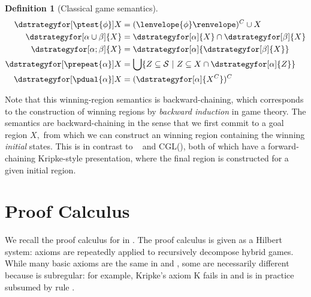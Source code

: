 \documentclass[12pt]{cmuthesis}
\theoremstyle{definition}
\newtheorem{definition}{Definition}
\theoremstyle{remark}
\newcommand{\rref}[2][]{\prettyref{#2}}
\newcommand{\allstate}{\mathcal{S}}
\newcommand{\CGL}{\textsf{CGL}\xspace}
\newcommand{\fint}[1]{\lenvelope{#1}\renvelope}
\begin{document}
\begin{definition}[Classical game semantics]
\begin{align*}
\dstrategyfor[\ptest{\phi}]{X}         &= (\fint{\phi})^C \cup X\\
\dstrategyfor[\alpha\cup\beta]{X}   &= \dstrategyfor[\alpha]{X} \cap \dstrategyfor[\beta]{X}\\
\dstrategyfor[\alpha;\beta]{X}      &=  \dstrategyfor[\alpha]{\dstrategyfor[\beta]{X}}\\
\dstrategyfor[\prepeat{\alpha}]{X}  &= \bigcup\{Z \subseteq \allstate~|~ Z \subseteq X \cap \dstrategyfor[\alpha]{Z}\}\\
\dstrategyfor[\pdual{\alpha}]{X}    &= (\dstrategyfor[\alpha]{X^C})^C
\end{align*}
\end{definition}
Note that this winning-region semantics is backward-chaining, which corresponds to the construction of winning regions by \emph{backward induction} in game theory.
The semantics are backward-chaining in the sense that we first commit to a goal region $X,$ from which we can construct an winning region containing the winning \emph{initial} states.
This is in contrast to \dL~\cite{DBLP:books/sp/Platzer18} and \CGL (\rref{ch:cgl}), both of which have a forward-chaining Kripke-style presentation, where the final region is constructed for a given initial region.

\section{Proof Calculus}
We recall the proof calculus for \dGL in \rref{fig:dgl-axioms}.
The proof calculus is given as a Hilbert system: axioms are repeatedly applied to recursively decompose hybrid games.
While many basic axioms are the same in \dL and \dGL, some are necessarily different because \dGL is subregular: for example, Kripke's axiom K fails in \dGL and is in practice subsumed by rule .
\end{document}

